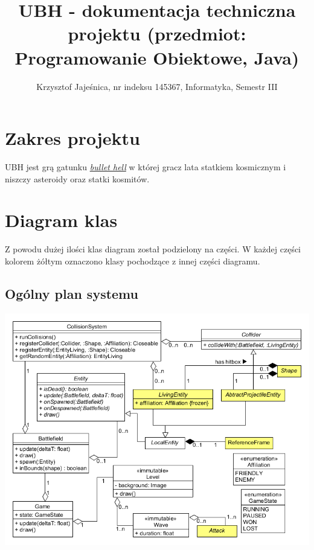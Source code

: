\documentclass{article}
\newcommand{\projectname}{UBH}
\begin{document}
	\title{\projectname{} - dokumentacja techniczna projektu (przedmiot: Programowanie Obiektowe, Java)}
	\author{Krzysztof Jajeśnica, nr indeksu 145367, Informatyka, Semestr III}
	\maketitle
	
	\section{Zakres projektu}
		
		\projectname{} jest grą gatunku \href{https://en.wikipedia.org/wiki/Shoot_em_up#Types}{\textit{bullet hell}} w której gracz lata statkiem kosmicznym i niszczy asteroidy oraz statki kosmitów. 
		
	\section{Diagram klas}
		Z powodu dużej ilości klas diagram został podzielony na części. W każdej części kolorem żółtym oznaczono klasy pochodzące z innej części diagramu.
		
		\subsection{Ogólny plan systemu}
			\begin{center}
				\includegraphics[width=\linewidth]{classdiag-core.png} \\
			\end{center}
		
\end{document}
